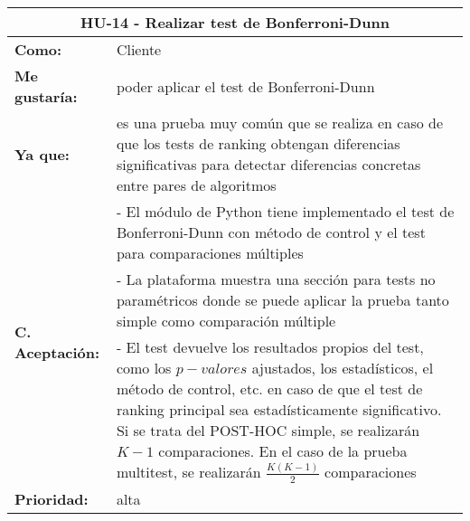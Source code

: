 
\begin{table}[H]
	\begin{tabular}{| p{3cm}| p{11cm} |}
		\hline
		\multicolumn{2}{|c|}{\textbf{HU-14} - Realizar test de Bonferroni-Dunn} \\ \hline
		\textbf{Como:} & Cliente \\ \hline
		\textbf{Me gustaría:} & poder aplicar el test de Bonferroni-Dunn \\ \hline
		\textbf{Ya que:} & es una prueba muy común que se realiza en caso de que los tests de ranking obtengan diferencias significativas para detectar diferencias concretas entre pares de algoritmos \\ \hline
		\multirow{3}{11cm}{\textbf{C. Aceptación:}} & - El módulo de Python tiene implementado el test de Bonferroni-Dunn con método de control y el test para comparaciones múltiples \\
		& - La plataforma muestra una sección para tests no paramétricos donde se puede aplicar la prueba tanto simple como comparación múltiple \\
		& - El test devuelve los resultados propios del test, como los $p-valores$ ajustados, los estadísticos, el método de control, etc. en caso de que el test de ranking principal sea estadísticamente significativo. Si se trata del POST-HOC simple, se realizarán $K-1$ comparaciones. En el caso de la prueba multitest, se realizarán $\frac{K(K-1)}{2}$ comparaciones \\ \hline
		\textbf{\textbf{Prioridad:}} & alta \\ \hline
	\end{tabular}
\end{table}


